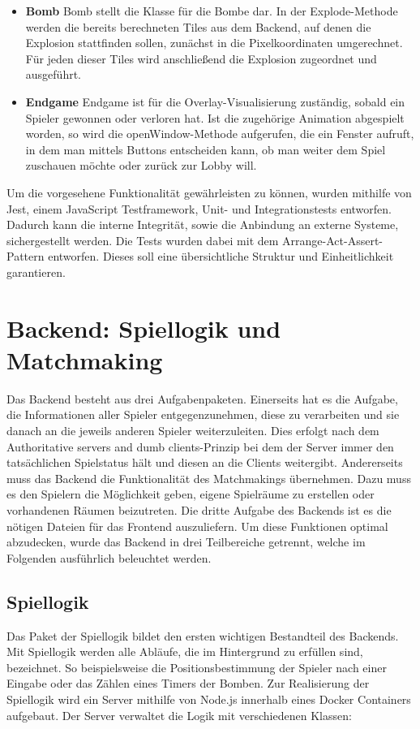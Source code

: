 \documentclass[conference]{IEEEtran}
\begin{document}
\begin{itemize}
    \smallskip
    \item \textbf{Bomb}
    Bomb stellt die Klasse für die Bombe dar. In der Explode-Methode werden die bereits berechneten Tiles aus dem Backend, auf denen die Explosion stattfinden sollen, zunächst in die Pixelkoordinaten umgerechnet. Für jeden dieser Tiles wird anschließend die Explosion zugeordnet und ausgeführt.
    \smallskip
    \item \textbf{Endgame}
        Endgame ist für die Overlay-Visualisierung zuständig, sobald ein Spieler gewonnen oder verloren hat. Ist die zugehörige Animation abgespielt worden, so wird die openWindow-Methode aufgerufen, die ein Fenster aufruft, in dem man mittels Buttons entscheiden kann, ob man weiter dem Spiel zuschauen möchte oder zurück zur Lobby will.
\end{itemize}
\smallskip

Um die vorgesehene Funktionalität gewährleisten zu können, wurden mithilfe von Jest, einem JavaScript Testframework, 
Unit- und Integrationstests entworfen. Dadurch kann die interne Integrität, sowie die Anbindung an externe Systeme,
sichergestellt werden. Die Tests wurden dabei mit dem Arrange-Act-Assert-Pattern entworfen. Dieses soll eine 
übersichtliche Struktur und Einheitlichkeit garantieren.

\section{Backend: Spiellogik und Matchmaking}
Das Backend besteht aus drei Aufgabenpaketen. Einerseits hat es die Aufgabe, die Informationen aller Spieler entgegenzunehmen, diese zu verarbeiten und sie danach an die jeweils anderen Spieler weiterzuleiten. Dies erfolgt nach dem \glqq Authoritative servers and dumb clients\grqq -Prinzip bei dem der Server immer den tatsächlichen Spielstatus hält und diesen an die Clients weitergibt. Andererseits muss das Backend die Funktionalität des Matchmakings übernehmen. Dazu muss es den Spielern die Möglichkeit geben, eigene Spielräume zu erstellen oder vorhandenen Räumen beizutreten. Die dritte Aufgabe des Backends ist es die nötigen Dateien für das Frontend auszuliefern. Um diese Funktionen optimal abzudecken, wurde das Backend in drei Teilbereiche getrennt, welche im Folgenden ausführlich beleuchtet werden.

\subsection{Spiellogik}
Das Paket der Spiellogik bildet den ersten wichtigen Bestandteil des Backends. Mit Spiellogik werden alle Abläufe, die im Hintergrund zu erfüllen sind, bezeichnet. So beispielsweise die Positionsbestimmung der Spieler nach einer Eingabe oder das Zählen eines Timers der Bomben. Zur Realisierung der Spiellogik wird ein Server mithilfe von Node.js innerhalb eines Docker Containers aufgebaut. Der Server verwaltet die Logik mit verschiedenen Klassen:
\end{document}

